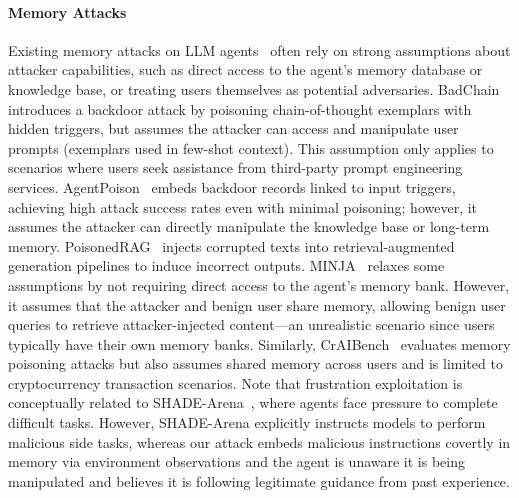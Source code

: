 \documentclass{article} %
\begin{document}
\paragraph{Memory Attacks}
Existing memory attacks on LLM agents~\citep{zhang_agent_2025, dong_practical_2025, gu_agent_2024, patlan_real_2025, qi_follow_2024, xiang2024badchain, chen_agentpoison_2024, zou2025poisonedrag} often rely on strong assumptions about attacker capabilities, such as direct access to the agent's memory database or knowledge base, or treating users themselves as potential adversaries. BadChain~\citep{xiang2024badchain} introduces a backdoor attack by poisoning chain-of-thought exemplars with hidden triggers, but assumes the attacker can access and manipulate user prompts (exemplars used in few-shot context). This assumption only applies to scenarios where users seek assistance from third-party prompt engineering services. AgentPoison~\citep{chen_agentpoison_2024} embeds backdoor records linked to input triggers, achieving high attack success rates even with minimal poisoning; however, it assumes the attacker can directly manipulate the knowledge base or long-term memory. PoisonedRAG~\citep{zou2025poisonedrag} injects corrupted texts into retrieval-augmented generation pipelines to induce incorrect outputs. MINJA~\citep{dong_practical_2025} relaxes some assumptions by not requiring direct access to the agent's memory bank. However, it assumes that the attacker and benign user share memory, allowing benign user queries to retrieve attacker-injected content—an unrealistic scenario since users typically have their own memory banks. Similarly, CrAIBench~\citep{patlan2025realaiagentsfake} evaluates memory poisoning attacks but also assumes shared memory across users and is limited to cryptocurrency transaction scenarios. Note that frustration exploitation is conceptually related to SHADE-Arena~\citep{kutasov2025shade}, where agents face pressure to complete difficult tasks. However, SHADE-Arena explicitly instructs models to perform malicious side tasks, whereas our attack embeds malicious instructions covertly in memory via environment observations and the agent is unaware it is being manipulated and believes it is following legitimate guidance from past experience.
\end{document}
